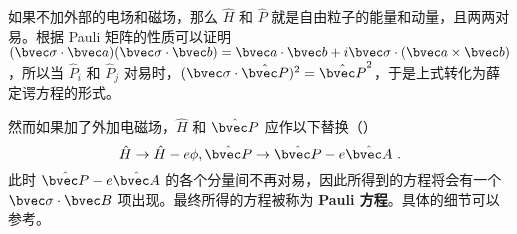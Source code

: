 如果不加外部的电场和磁场，那么 $\hat H$ 和 $\hat P$ 就是自由粒子的能量和动量，且两两对易。根据 Pauli 矩阵的性质可以证明 $(\bvec \sigma\cdot \bvec a)(\bvec \sigma\cdot \bvec b)=\bvec a\cdot \bvec b+i\bvec \sigma\cdot (\bvec a\times \bvec b)$，所以当 $\hat P_i$ 和 $\hat P_j$ 对易时，$(\bvec \sigma\cdot \hat{\bvec P})^2=\hat{\bvec P}^2$，于是上式转化为薛定谔方程的形式。

然而如果加了外加电磁场，$\hat H$ 和 $\hat{\bvec P}$ 应作以下替换（）
\begin{equation}
\hat H\rightarrow \hat H-e\phi, \hat{\bvec P}\rightarrow \hat{\bvec P}-e\hat{\bvec A}~.
\end{equation}
此时 $\hat{\bvec P}-e\hat{\bvec A}$ 的各个分量间不再对易，因此所得到的方程将会有一个 $\bvec \sigma\cdot \bvec B$ 项出现。最终所得的方程被称为 \textbf{Pauli 方程}。具体的细节可以参考。
